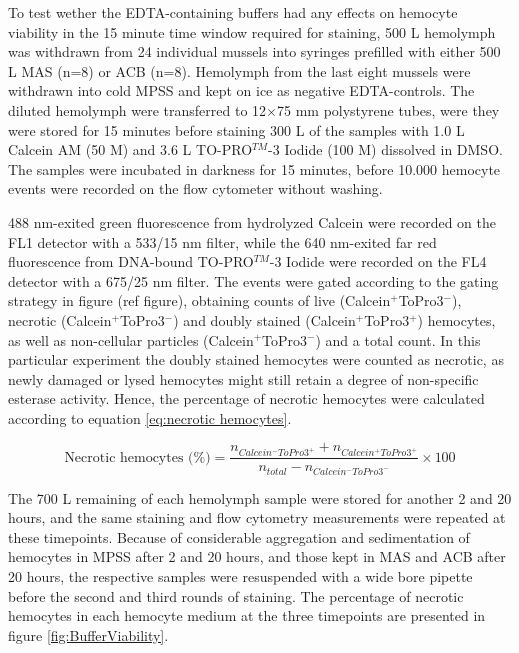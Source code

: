 To test wether the EDTA-containing buffers had any effects on hemocyte viability in the 15 minute time window required for staining, 500 \micro L hemolymph was withdrawn from 24 individual mussels into syringes prefilled with either 500 \micro L MAS (n=8) or ACB (n=8). Hemolymph from the last eight mussels were withdrawn into cold MPSS and kept on ice as negative EDTA-controls. The diluted hemolymph were transferred to 12$\times$75 mm polystyrene tubes, were they were stored for 15 minutes before staining 300 \micro L of the samples with 1.0 \micro L Calcein AM (50 \micro M) and 3.6 \micro L TO-PRO$^{TM}$-3 Iodide (100 \micro M) dissolved in DMSO. The samples were incubated in darkness for 15 minutes, before 10.000 hemocyte events were recorded on the flow cytometer without washing.

488 nm-exited green fluorescence from hydrolyzed Calcein were recorded on the FL1 detector with a 533/15 nm filter, while the 640 nm-exited far red fluorescence from DNA-bound TO-PRO$^{TM}$-3 Iodide were recorded on the FL4 detector with a 675/25 nm filter. The events were gated according to the gating strategy in figure (ref figure), obtaining counts of live (Calcein$^{+}$ToPro3$^{-}$), necrotic (Calcein$^{+}$ToPro3$^{-}$) and doubly stained (Calcein$^{+}$ToPro3$^{+}$) hemocytes, as well as non-cellular particles (Calcein$^{+}$ToPro3$^{-}$) and a total count. In this particular experiment the doubly stained hemocytes were counted as necrotic, as newly damaged or lysed hemocytes might still retain a degree of non-specific esterase activity. Hence, the percentage of necrotic hemocytes were calculated according to equation \ref{eq:necrotic hemocytes}.

\begin{equation}
    \label{eq:necrotic hemocytes}
    \text{Necrotic hemocytes (\%)} = \dfrac{n_{Calcein^{-}ToPro3^{+}} + n_{Calcein^{+}ToPro3^{+}}}{n_{total} - n_{Calcein^{-}ToPro3^{-}}} \times 100
\end{equation}

The 700 \micro L remaining of each hemolymph sample were stored for another 2 and 20 hours, and the same staining and flow cytometry measurements were repeated at these timepoints. Because of considerable aggregation and sedimentation of hemocytes in MPSS after 2 and 20 hours, and those kept in MAS and ACB after 20 hours, the respective samples were resuspended with a wide bore pipette before the second and third rounds of staining. The percentage of necrotic hemocytes in each hemocyte medium at the three timepoints are presented in figure \ref{fig:BufferViability}.

